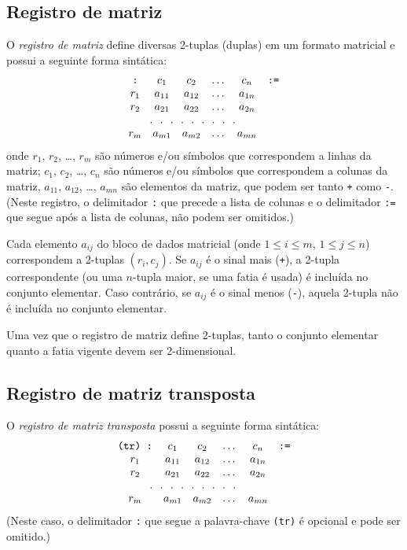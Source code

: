 \documentclass[11pt, brazil]{report}
\begin{document}
\subsection{Registro de matriz}

O {\it registro de matriz} define diversas 2-tuplas (duplas) em
um formato matricial e possui a seguinte forma sintática:
$$\begin{array}{cccccc}
\mbox{{\tt:}}&c_1&c_2&\dots&c_n&\mbox{{\tt:=}}\\
r_1&a_{11}&a_{12}&\dots&a_{1n}&\\
r_2&a_{21}&a_{22}&\dots&a_{2n}&\\
\multicolumn{5}{c}{.\ \ .\ \ .\ \ .\ \ .\ \ .\ \ .\ \ .\ \ .}&\\
r_m&a_{m1}&a_{m2}&\dots&a_{mn}&\\
\end{array}$$
onde $r_1$, $r_2$, \dots, $r_m$ são números e/ou símbolos
que correspondem a linhas da matriz; $c_1$, $c_2$, \dots, $c_n$ são
números e/ou símbolos que correspondem a colunas da matriz, $a_{11}$,
$a_{12}$, \dots, $a_{mn}$ são elementos da matriz, que podem ser tanto
{\tt+} como {\tt-}. (Neste registro, o delimitador {\tt:} que precede a
lista de colunas e o delimitador {\tt:=} que segue após a lista de colunas,
não podem ser omitidos.)

Cada elemento $a_{ij}$ do bloco de dados matricial (onde $1\leq i\leq m$,
$1\leq j\leq n$) correspondem a 2-tuplas $(r_i,c_j)$. Se $a_{ij}$ é o
sinal mais ({\tt+}), a 2-tupla correspondente (ou uma $n$-tupla maior, se uma
fatia é usada) é incluída no conjunto elementar. Caso contrário, se $a_{ij}$ é o
sinal menos ({\tt-}), aquela 2-tupla não é incluída no conjunto elementar.

Uma vez que o registro de matriz define 2-tuplas, tanto o conjunto elementar
quanto a fatia vigente devem ser 2-dimensional.

\newpage

\subsection{Registro de matriz transposta}

O {\it registro de matriz transposta} possui a seguinte forma sintática:
$$\begin{array}{cccccc}
\mbox{{\tt(tr) :}}&c_1&c_2&\dots&c_n&\mbox{{\tt:=}}\\
r_1&a_{11}&a_{12}&\dots&a_{1n}&\\
r_2&a_{21}&a_{22}&\dots&a_{2n}&\\
\multicolumn{5}{c}{.\ \ .\ \ .\ \ .\ \ .\ \ .\ \ .\ \ .\ \ .}&\\
r_m&a_{m1}&a_{m2}&\dots&a_{mn}&\\
\end{array}$$
(Neste caso, o delimitador {\tt:} que segue a palavra-chave {\tt(tr)} é
opcional e pode ser omitido.)
\end{document}
